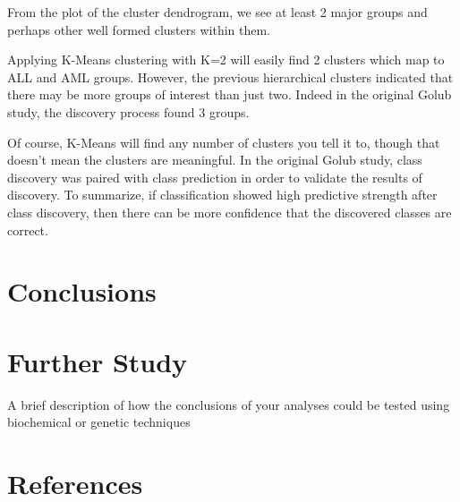 \documentclass[]{article}
\begin{document}
From the plot of the cluster dendrogram, we see at least 2 major groups
and perhaps other well formed clusters within them.

Applying K-Means clustering with K=2 will easily find 2 clusters which
map to ALL and AML groups. However, the previous hierarchical clusters
indicated that there may be more groups of interest than just two.
Indeed in the original Golub study, the discovery process found 3
groups.

Of course, K-Means will find any number of clusters you tell it to,
though that doesn't mean the clusters are meaningful. In the original
Golub study, class discovery was paired with class prediction in order
to validate the results of discovery. To summarize, if classification
showed high predictive strength after class discovery, then there can be
more confidence that the discovered classes are correct.

\section{Conclusions}\label{conclusions}

\section{Further Study}\label{further-study}

A brief description of how the conclusions of your analyses could be
tested using biochemical or genetic techniques

\section{References}\label{references}
\end{document}
